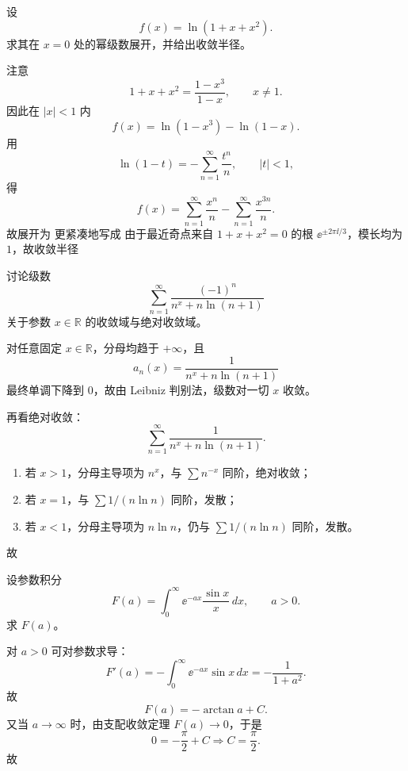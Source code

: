 \begin{question}
设
\[
 f(x)=\ln(1+x+x^2).
\]
求其在 $x=0$ 处的幂级数展开，并给出收敛半径。
\begin{solution}

注意
\[
1+x+x^2=\frac{1-x^3}{1-x},\qquad x\ne1.
\]
因此在 $|x|<1$ 内
\[
 f(x)=\ln(1-x^3)-\ln(1-x).
\]
用
\[
\ln(1-t)=-\sum_{n=1}^{\infty}\frac{t^n}{n},\qquad |t|<1,
\]
得
\[
 f(x)=\sum_{n=1}^{\infty}\frac{x^n}{n}-\sum_{n=1}^{\infty}\frac{x^{3n}}{n}.
\]
故展开为
更紧凑地写成
由于最近奇点来自 $1+x+x^2=0$ 的根 $\ee^{\pm 2\pi\ii/3}$，模长均为 $1$，故收敛半径
\end{solution}
\end{question}

\begin{question}
讨论级数
\[
\sum_{n=1}^{\infty}\frac{(-1)^n}{n^x+n\ln(n+1)}
\]
关于参数 $x\in\mathbb R$ 的收敛域与绝对收敛域。
\begin{solution}

对任意固定 $x\in\mathbb R$，分母均趋于 $+\infty$，且
\[
 a_n(x)=\frac{1}{n^x+n\ln(n+1)}
\]
最终单调下降到 $0$，故由 Leibniz 判别法，级数对一切 $x$ 收敛。

再看绝对收敛：
\[
\sum_{n=1}^{\infty}\frac{1}{n^x+n\ln(n+1)}.
\]
\begin{enumerate}[label=(\arabic*),leftmargin=2.8em,itemsep=0.2em]
\item 若 $x>1$，分母主导项为 $n^x$，与 $\sum n^{-x}$ 同阶，绝对收敛；
\item 若 $x=1$，与 $\sum 1/(n\ln n)$ 同阶，发散；
\item 若 $x<1$，分母主导项为 $n\ln n$，仍与 $\sum 1/(n\ln n)$ 同阶，发散。
\end{enumerate}
故
\end{solution}
\end{question}

\begin{question}
设参数积分
\[
F(a)=\int_0^{\infty}\ee^{-ax}\frac{\sin x}{x}\,dx,\qquad a>0.
\]
求 $F(a)$。
\begin{solution}

对 $a>0$ 可对参数求导：
\[
F'(a)=-\int_0^{\infty}\ee^{-ax}\sin x\,dx=-\frac{1}{1+a^2}.
\]
故
\[
F(a)=-\arctan a+C.
\]
又当 $a\to\infty$ 时，由支配收敛定理 $F(a)\to0$，于是
\[
0=-\frac\pi2+C\Longrightarrow C=\frac\pi2.
\]
故
\end{solution}
\end{question}


